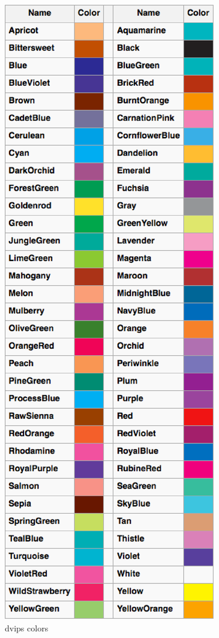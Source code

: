 \documentclass[11pt,a4paper,english]{article}
\begin{document}
\begin{figure}[ht!]
\centering
\includegraphics[scale=0.5]{images/dvips_colors.eps}
\caption{dvips colors}
\label{fig:dvips_colors}   
\end{figure}
\end{document}
